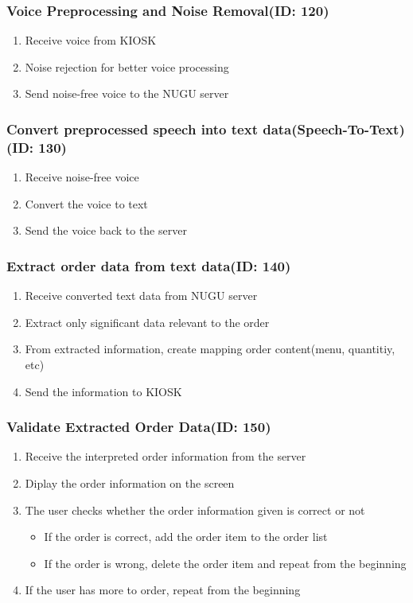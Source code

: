 \documentclass[conference,compsoc]{IEEEtran}
\begin{document}
\subsubsection{Voice Preprocessing and Noise Removal(ID: 120)}
\begin{enumerate}
  \item Receive voice from KIOSK
  \item Noise rejection for better voice processing
  \item Send noise-free voice to the NUGU server
\end{enumerate}

\subsubsection{Convert preprocessed speech into text data(Speech-To-Text)(ID: 130)}
\begin{enumerate}
  \item Receive noise-free voice
  \item Convert the voice to text
  \item Send the voice back to the server
\end{enumerate}

\subsubsection{Extract order data from text data(ID: 140)}
\begin{enumerate}
  \item Receive converted text data from NUGU server
  \item Extract only significant data relevant to the order
  \item From extracted information, create mapping order content(menu, quantitiy, etc)
  \item Send the information to KIOSK
\end{enumerate}

\subsubsection{Validate Extracted Order Data(ID: 150)}
\begin{enumerate}
  \item Receive the interpreted order information from the server
  \item Diplay the order information on the screen
  \item The user checks whether the order information given is correct or not
  \begin{itemize}
    \item If the order is correct, add the order item to the order list
    \item If the order is wrong, delete the order item and repeat from the beginning
  \end{itemize}
  \item If the user has more to order, repeat from the beginning
\end{enumerate}
\end{document}
